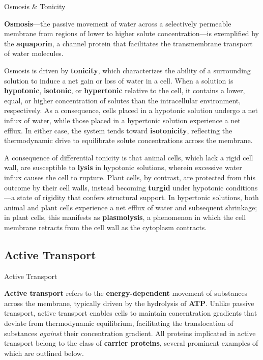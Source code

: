 \documentclass[10pt]{article}
\begin{document}
    \begin{core}[label=core:osmosis_tonicity]{Osmosis \& Tonicity}

      \textbf{Osmosis}---the passive movement of water across a selectively permeable membrane from regions of lower to higher solute concentration---is exemplified by the \textbf{aquaporin}, a channel protein that facilitates the transmembrane transport of water molecules.

      Osmosis is driven by \textbf{tonicity}, which characterizes the ability of a surrounding solution to induce a net gain or loss of water in a cell. When a solution is \textbf{hypotonic}, \textbf{isotonic}, or \textbf{hypertonic} relative to the cell, it contains a lower, equal, or higher concentration of solutes than the intracellular environment, respectively. As a consequence, cells placed in a hypotonic solution undergo a net influx of water, while those placed in a hypertonic solution experience a net efflux. In either case, the system tends toward \textbf{isotonicity}, reflecting the thermodynamic drive to equilibrate solute concentrations across the membrane.

      A consequence of differential tonicity is that animal cells, which lack a rigid cell wall, are susceptible to \textbf{lysis} in hypotonic solutions, wherein excessive water influx causes the cell to rupture. Plant cells, by contrast, are protected from this outcome by their cell walls, instead becoming \textbf{turgid} under hypotonic conditions---a state of rigidity that confers structural support. In hypertonic solutions, both animal and plant cells experience a net efflux of water and subsequent shrinkage; in plant cells, this manifests as \textbf{plasmolysis}, a phenomenon in which the cell membrane retracts from the cell wall as the cytoplasm contracts.


    \end{core}

  \subsection{Active Transport}

    \begin{core}{Active Transport}

      \textbf{Active transport} refers to the \textbf{energy-dependent} movement of substances across the membrane, typically driven by the hydrolysis of \textbf{ATP}. Unlike passive transport, active transport enables cells to maintain concentration gradients that deviate from thermodynamic equilibrium, facilitating the translocation of substances \textit{against} their concentration gradient. All proteins implicated in active transport belong to the class of \textbf{carrier proteins}, several prominent examples of which are outlined below.

    \end{core}    
\end{document}
